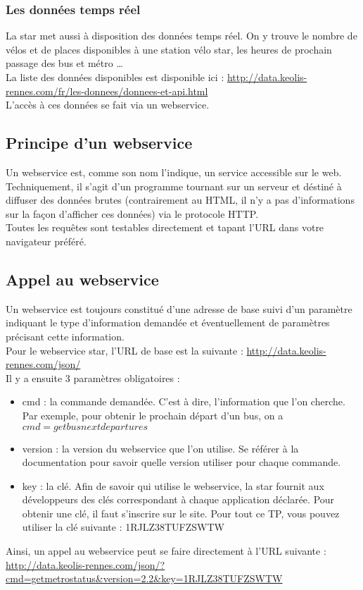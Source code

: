\documentclass{article}
\begin{document}
\subsubsection{Les données temps réel}
La star met aussi à disposition des données temps réel. On y trouve le nombre de
vélos et de places disponibles à une station vélo star, les heures de prochain
passage des bus et métro \ldots\\
La liste des données disponibles est disponible ici : 
\href{http://data.keolis-rennes.com/fr/les-donnees/donnees-et-api.html}{http://data.keolis-rennes.com/fr/les-donnees/donnees-et-api.html}\\
L'accès à ces données se fait via un webservice.

\subsection{Principe d'un webservice}
Un webservice est, comme son nom l'indique, un service accessible sur le web.\\
Techniquement, il s'agit d'un programme tournant sur un serveur et déstiné à
diffuser des données brutes (contrairement au HTML, il n'y a pas d'informations
sur la façon d'afficher ces données) via le protocole HTTP.\\
Toutes les requêtes sont testables directement et tapant l'URL dans votre
navigateur préféré.
\subsection{Appel au webservice}
Un webservice est toujours constitué d'une adresse de base suivi d'un paramètre
indiquant le type d'information demandée et éventuellement de paramètres
précisant cette information.\\
Pour le webservice star, l'URL de base est la suivante : 
\href{http://data.keolis-rennes.com/json/}{http://data.keolis-rennes.com/json/}\\
Il y a ensuite 3 paramètres obligatoires :
\begin{itemize}
  \item cmd : la commande demandée. C'est à dire, l'information que l'on
  cherche. Par exemple, pour obtenir le prochain départ d'un bus, on a
  $cmd=getbusnextdepartures$
  \item version : la version du webservice que l'on utilise. Se référer à la
  documentation pour savoir quelle version utiliser pour chaque commande. 
  \item key : la clé. Afin de savoir qui utilise le webservice, la star fournit
  aux développeurs des clés correspondant à chaque application déclarée. Pour
  obtenir une clé, il faut s'inscrire sur le site. Pour tout ce TP, vous pouvez
  utiliser la clé suivante : 1RJLZ38TUFZSWTW
\end{itemize}
Ainsi, un appel au webservice peut se faire directement à l'URL suivante :\\
\href{http://data.keolis-rennes.com/json/?cmd=getmetrostatus&version=2.2&key=1RJLZ38TUFZSWTW}{http://data.keolis-rennes.com/json/?cmd=getmetrostatus&version=2.2&key=1RJLZ38TUFZSWTW}
\end{document}
